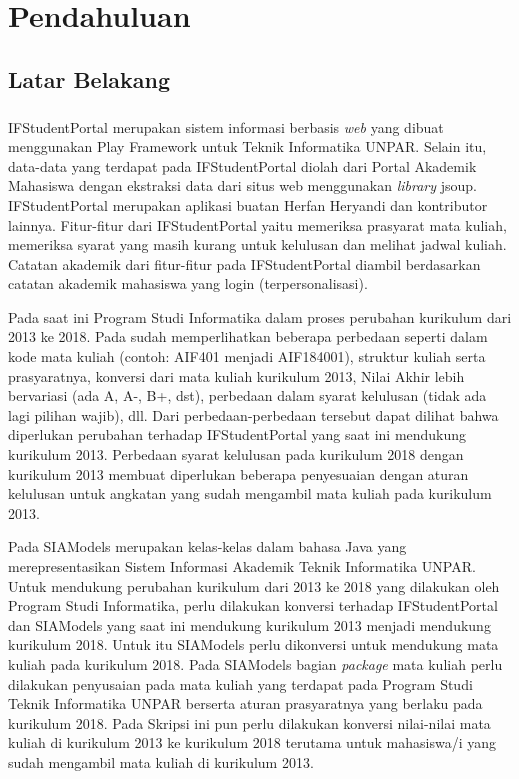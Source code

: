 \chapter{Pendahuluan}
\label{chap:intro}
   
\section{Latar Belakang}
\label{sec:label}

\paragraph{} IFStudentPortal\cite{ifstudentportal} merupakan sistem informasi berbasis  \textit{web} yang dibuat menggunakan Play Framework \cite{Leroux:2014} untuk Teknik Informatika UNPAR. Selain itu, data-data yang terdapat pada IFStudentPortal diolah dari Portal Akademik Mahasiswa dengan ekstraksi data dari situs web menggunakan \textit{library} jsoup. IFStudentPortal merupakan aplikasi buatan Herfan Heryandi dan kontributor lainnya. Fitur-fitur dari IFStudentPortal yaitu memeriksa prasyarat mata kuliah, memeriksa syarat yang masih kurang untuk kelulusan dan melihat jadwal kuliah. Catatan akademik dari fitur-fitur pada IFStudentPortal diambil berdasarkan catatan akademik mahasiswa yang login (terpersonalisasi).

Pada saat ini Program Studi Informatika dalam proses perubahan kurikulum dari 2013 ke 2018. Pada \cite{dokumenkurikulum2018} sudah memperlihatkan beberapa perbedaan seperti dalam kode mata kuliah (contoh: AIF401 menjadi AIF184001), struktur kuliah serta prasyaratnya, konversi dari mata kuliah kurikulum 2013, Nilai Akhir lebih bervariasi (ada A, A-, B+, dst), perbedaan dalam syarat kelulusan (tidak ada lagi pilihan wajib), dll. Dari perbedaan-perbedaan tersebut dapat dilihat bahwa diperlukan perubahan terhadap IFStudentPortal yang saat ini mendukung kurikulum 2013. Perbedaan syarat kelulusan pada kurikulum 2018 dengan kurikulum 2013 membuat diperlukan beberapa penyesuaian dengan aturan kelulusan untuk angkatan yang sudah mengambil mata kuliah pada kurikulum 2013.

Pada SIAModels\cite{siamodels} merupakan kelas-kelas dalam bahasa Java yang merepresentasikan Sistem Informasi Akademik Teknik Informatika UNPAR. Untuk mendukung perubahan kurikulum dari 2013 ke 2018 yang dilakukan oleh Program Studi Informatika, perlu dilakukan konversi terhadap IFStudentPortal dan SIAModels yang saat ini mendukung kurikulum 2013 menjadi mendukung kurikulum 2018.  Untuk itu SIAModels perlu dikonversi untuk mendukung mata kuliah pada kurikulum 2018. Pada SIAModels bagian \textit{package} mata kuliah perlu dilakukan penyusaian pada mata kuliah yang terdapat pada Program Studi Teknik Informatika UNPAR berserta aturan prasyaratnya yang berlaku pada kurikulum 2018. Pada Skripsi ini pun perlu dilakukan konversi nilai-nilai mata kuliah di kurikulum 2013 ke kurikulum 2018 terutama untuk mahasiswa/i yang sudah mengambil mata kuliah di kurikulum 2013.

